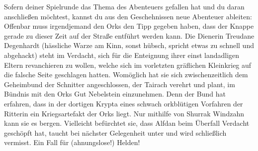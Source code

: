 

Sofern deiner Spielrunde das Thema des Abenteuers gefallen hat und du daran anschließen möchtest, kannst du aus den Geschehnissen neue Abenteuer ableiten: Offenbar muss irgendjemand den Orks den Tipp gegeben haben, dass der Knappe gerade zu dieser Zeit auf der Straße entführt werden kann. Die Dienerin Treudane Degenhardt (hässliche Warze am Kinn, sonst hübsch, spricht etwas zu schnell und abgehackt) steht im Verdacht, sich für die Enteignung ihrer einst landadligen Eltern revanchieren zu wollen, welche sich im vorletzten gräflichen Kleinkrieg auf die falsche Seite geschlagen hatten. Womöglich hat sie sich zwischenzeitlich dem Geheimbund der Schnitter angeschlossen, der Tairach verehrt und plant, im Bündnis mit den Orks Gut Nebelstein einzunehmen. Denn der Bund hat erfahren, dass in der dortigen Krypta eines schwach orkblütigen Vorfahren der Ritterin ein Kriegsartefakt der Orks liegt. Nur mithilfe von Shurrak Windzahn kann sie es bergen. Vielleicht befürchtet sie, dass Alfdan beim Überfall Verdacht geschöpft hat, taucht bei nächster Gelegenheit unter und wird schließlich vermisst. Ein Fall für (ahnungslose!) Helden!






